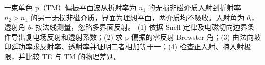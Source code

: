 一束单色 p（TM）偏振平面波从折射率为 \(n_{1}\) 的无损非磁介质入射到折射率 \(n_{2}>n_{1}\) 的另一无损非磁介质，界面为理想平面，两介质均不吸收。入射角为 \(\theta \)ᵢ，透射角 \(\theta \)ₜ 按法线测量，忽略多界面反射。
(1) 依据 Snell 定律及电磁切向边界条件导出复电场反射和透射系数；(2) 求 p 偏振的零反射 Brewster 角；(3) 由法向坡印廷功率求反射率、透射率并证明二者相加等于一；(4) 检查正入射、掠入射极限，并比较 TE 与 TM 的物理差别。
